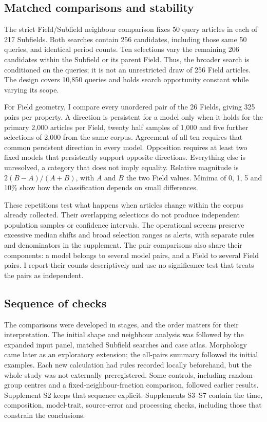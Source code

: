 \documentclass[12pt]{article}
\begin{document}
\subsection{Matched comparisons and stability}
The strict Field/Subfield neighbour comparison fixes 50 query articles in each of 217 Subfields. Both searches contain 256 candidates, including those same 50 queries, and identical period counts. Ten selections vary the remaining 206 candidates within the Subfield or its parent Field. Thus, the broader search is conditioned on the queries; it is not an unrestricted draw of 256 Field articles. The design covers 10,850 queries and holds search opportunity constant while varying its scope.

For Field geometry, I compare every unordered pair of the 26 Fields, giving 325 pairs per property. A direction is persistent for a model only when it holds for the primary 2,000 articles per Field, twenty half samples of 1,000 and five further selections of 2,000 from the same corpus. Agreement of all ten requires that common persistent direction in every model. Opposition requires at least two fixed models that persistently support opposite directions. Everything else is unresolved, a category that does not imply equality. Relative magnitude is $2(B-A)/(A+B)$, with $A$ and $B$ the two Field values. Minima of 0, 1, 5 and 10\% show how the classification depends on small differences.

These repetitions test what happens when articles change within the corpus already collected. Their overlapping selections do not produce independent population samples or confidence intervals. The operational screens preserve excessive median shifts and broad selection ranges as alerts, with separate rules and denominators in the supplement. The pair comparisons also share their components: a model belongs to several model pairs, and a Field to several Field pairs. I report their counts descriptively and use no significance test that treats the pairs as independent.

\subsection{Sequence of checks}
The comparisons were developed in stages, and the order matters for their interpretation. The initial shape and neighbour analysis was followed by the expanded input panel, matched Subfield searches and case atlas. Morphology came later as an exploratory extension; the all-pairs summary followed its initial examples. Each new calculation had rules recorded locally beforehand, but the whole study was not externally preregistered. Some controls, including random-group centres and a fixed-neighbour-fraction comparison, followed earlier results. Supplement S2 keeps that sequence explicit. Supplements S3--S7 contain the time, composition, model-trait, source-error and processing checks, including those that constrain the conclusions.
\end{document}
